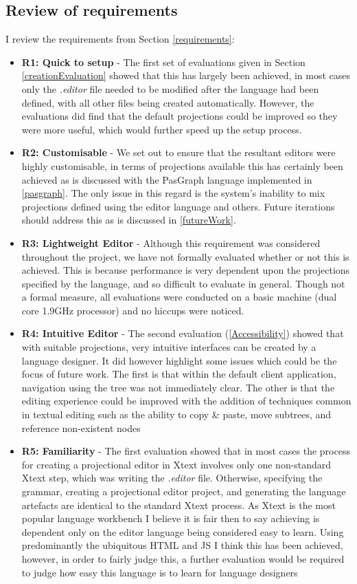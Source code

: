 \documentclass{article}
\begin{document}
{\subsection{Review of requirements}
I review the requirements from Section \ref{requirements}:
\begin{itemize}
\item{\textbf{R1: Quick to setup} - The first set of evaluations given in Section \ref{creationEvaluation} showed that this has largely been achieved, in most cases only the \emph{.editor} file needed to be modified after the language had been defined, with all other files being created automatically. However, the evaluations did find that the default projections could be improved so they were more useful, which would further speed up the setup process.}
\item{\textbf{R2: Customisable} - We set out to ensure that the resultant editors were highly customisable, in terms of projections available this has certainly been achieved as is discussed with the PasGraph language implemented in \ref{pasgraph}. The only issue in this regard is the system's inability to mix projections defined using the editor language and others. Future iterations should address this as is discussed in \ref{futureWork}.  }
\item{\textbf{R3: Lightweight Editor} - Although this requirement was considered throughout the project, we have not formally evaluated whether or not this is achieved. This is because performance is very dependent upon the projections specified by the language, and so difficult to evaluate in general. Though not a formal measure, all evaluations were conducted on a basic machine (dual core 1.9GHz processor) and no hiccups were noticed. }
\item{\textbf{R4: Intuitive Editor} - The second evaluation (\ref{Accessibility}) showed that with suitable projections, very intuitive interfaces can be created by a language designer. It did however highlight some issues which could be the focus of future work. The first is that within the default client application, navigation using the tree was not immediately clear. The other is that the editing experience could be improved with the addition of techniques common in textual editing such as the ability to copy \& paste, move subtrees, and reference non-existent nodes}
\item{\textbf{R5: Familiarity} - The first evaluation showed that in most cases the process for creating a projectional editor in Xtext involves only one non-standard Xtext step, which was writing the \emph{.editor} file. Otherwise, specifying the grammar, creating a projectional editor project, and generating the language artefacts are identical to the standard Xtext process. As Xtext is the most popular language workbench I believe it is fair then to say achieving \RFamiliarity is dependent only on the editor language being considered easy to learn. Using predominantly the ubiquitous HTML and JS I think this has been achieved, however, in order to fairly judge this, a further evaluation would be required to judge how easy this language is to learn for language designers}
\end{itemize}

}
\end{document}
